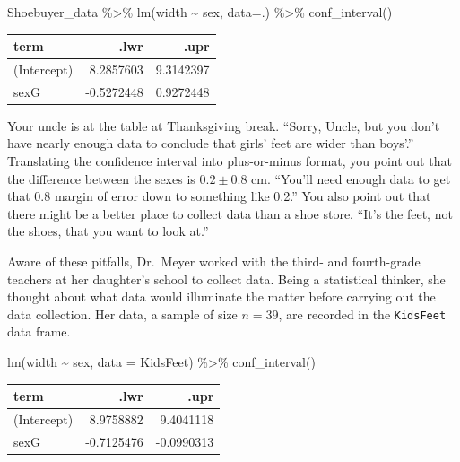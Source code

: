 \documentclass[
  letterpaper,
  DIV=11,
  numbers=noendperiod,
  oneside]{scrreprt}
\newenvironment{Shaded}{\begin{snugshade}}{\end{snugshade}}
\newcommand{\AttributeTok}[1]{\textcolor[rgb]{0.40,0.45,0.13}{#1}}
\newcommand{\FunctionTok}[1]{\textcolor[rgb]{0.28,0.35,0.67}{#1}}
\newcommand{\NormalTok}[1]{\textcolor[rgb]{0.00,0.23,0.31}{#1}}
\newcommand{\SpecialCharTok}[1]{\textcolor[rgb]{0.37,0.37,0.37}{#1}}
\begin{document}
\begin{Shaded}
\begin{Highlighting}[]
\NormalTok{Shoebuyer\_data }\SpecialCharTok{\%\textgreater{}\%} \FunctionTok{lm}\NormalTok{(width }\SpecialCharTok{\textasciitilde{}}\NormalTok{ sex, }\AttributeTok{data=}\NormalTok{.) }\SpecialCharTok{\%\textgreater{}\%} \FunctionTok{conf\_interval}\NormalTok{()}
\end{Highlighting}
\end{Shaded}

\ttfamily 
\begin{tabular}{lrr}
\toprule
term & .lwr & .upr\\
\midrule
(Intercept) & 8.2857603 & 9.3142397\\
sexG & -0.5272448 & 0.9272448\\
\bottomrule
\end{tabular} \normalfont
\bigskip

Your uncle is at the table at Thanksgiving break. ``Sorry, Uncle, but
you don't have nearly enough data to conclude that girls' feet are wider
than boys'.'' Translating the confidence interval into plus-or-minus
format, you point out that the difference between the sexes is
\(0.2 \pm 0.8\) cm. ``You'll need enough data to get that 0.8 margin of
error down to something like 0.2.'' You also point out that there might
be a better place to collect data than a shoe store. ``It's the feet,
not the shoes, that you want to look at.''

Aware of these pitfalls, Dr.~Meyer worked with the third- and
fourth-grade teachers at her daughter's school to collect data. Being a
statistical thinker, she thought about what data would illuminate the
matter before carrying out the data collection. Her data, a sample of
size \(n=39\), are recorded in the \texttt{KidsFeet} data frame.

\begin{Shaded}
\begin{Highlighting}[]
\FunctionTok{lm}\NormalTok{(width }\SpecialCharTok{\textasciitilde{}}\NormalTok{ sex, }\AttributeTok{data =}\NormalTok{ KidsFeet) }\SpecialCharTok{\%\textgreater{}\%} \FunctionTok{conf\_interval}\NormalTok{()}
\end{Highlighting}
\end{Shaded}

\ttfamily 
\begin{tabular}{lrr}
\toprule
term & .lwr & .upr\\
\midrule
(Intercept) & 8.9758882 & 9.4041118\\
sexG & -0.7125476 & -0.0990313\\
\bottomrule
\end{tabular} \normalfont
\bigskip
\end{document}
